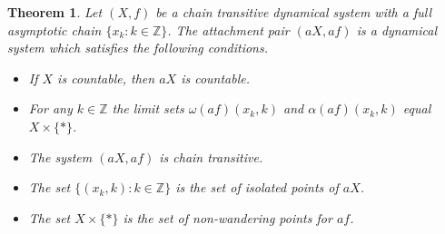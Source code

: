 \documentclass[12pt]{amsart}
\newtheorem{theo}{{\bfseries Theorem}}[section]
\def \Z {\mathbb Z}
\def \a {\alpha }
\def \om {\omega}
\numberwithin{equation}{section}
\begin{document}
 \begin{theo}\label{theo1.05} Let $(X,f)$ be a chain transitive dynamical system with a full asymptotic chain $\{ x_k : k \in \Z \}$.
 The \emph{attachment pair }$(aX, af)$ is a dynamical system which satisfies the following conditions.

 \begin{itemize}
 \item[(i)] If $X$ is countable, then $aX$ is countable.

 \item[(ii)]  For any $k \in \Z$ the limit sets $\om (af)(x_k,k)$ and $\a(af)(x_k,k)$ equal $ X \times \{ * \}$.


 \item[(iii)]  The system $(aX, af)$ is chain transitive.

 \item[(iv)]  The set $\{ (x_k,k) : k \in \Z \} $ is the set of isolated points of $aX$.

 \item[(v)]  The set $ X \times \{ * \} $ is the set of non-wandering points for $af$.
 \end{itemize}\end{theo}
\end{document}
